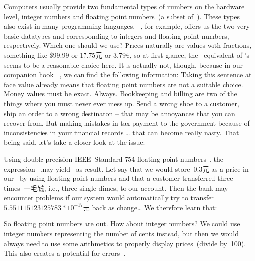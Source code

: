 Computers usually provide two fundamental types of numbers on the hardware level, integer numbers and floating point numbers~(a subset of~\realNumbers).
These types also exist in many programming languages.
\python~\cite{programmingWithPython}, for example, offers us the two very basic datatypes  and  corresponding to integers and floating point numbers, respectively.
Which one should we use?
Prices naturally are values with fractions, something like \$99.99 or 17.75元 or 3.79€, so at first glance, the \sql\ equivalent of \python's  seems to be a reasonable choice here.
It is actually not, though, because in our companion book ~\cite{programmingWithPython}, we can find the following information:%
%
%
%
Taking this sentence at face value already means that floating point numbers are not a suitable choice.
Money values must be exact.
Always.
Bookkeeping and billing are two of the things where you must never ever mess up.
Send a wrong shoe to a customer, ship an order to a wrong destinaton -- that may be annoyances that you can recover from.
But making mistakes in tax payment to the government because of inconsistencies in your financial records {\dots} that can become really nasty.
That being said, let's take a closer look at the issue:%
%
\begin{sloppypar}%
Using double precision IEEE~Standard 754 floating point numbers~\cite{IEEE2019ISFFPA,H1997IS7FPN}, the expression~ may yield~ as result.
Let say that we would store~0.3元 as a price in our \db\ by using floating point numbers and that a customer transferred three times~一毛钱, i.e., three single dimes, to our account.
Then the bank may encounter problems if our system would automatically try to transfer $5.551115123125783*10^{-17}$元 back as change\dots
We therefore learn that:%
\end{sloppypar}%
%
%
%
So floating point numbers are out.
How about integer numbers?
We could use integer numbers representing the number of cents instead, but then we would always need to use some arithmetics to properly display prices~(divide by~100).
This also creates a potential for errors~\cite{W2020HSISCVISS}.

